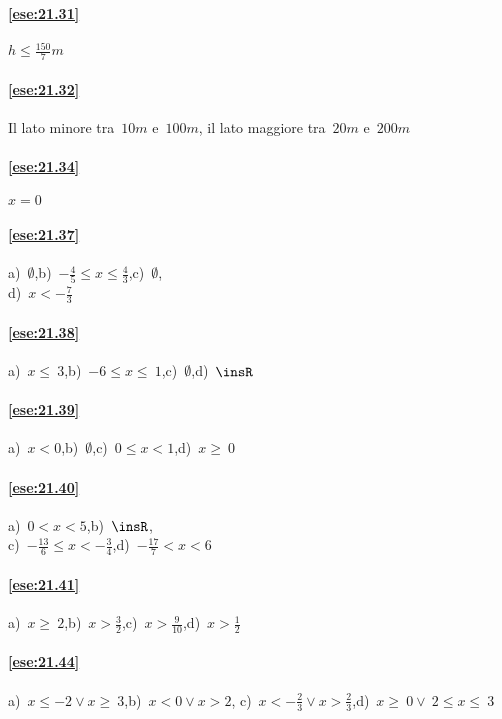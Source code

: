 \begin{multicols}{2}
\paragraph{\ref{ese:21.31}} \(h\le \frac{150}{7}m\)

\paragraph{\ref{ese:21.32}} Il lato minore tra~\(10\unit{m}\) e~\(100\unit{m}\), il lato maggiore tra~\(20\unit{m}\) e~\(200\unit{m}\)

\paragraph{\ref{ese:21.34}} \(x = 0\)

\paragraph{\ref{ese:21.37}} a)~\(\emptyset \),\quad b)~\(-{\frac{4}{5}}\le x\le\frac{4}{3}\),\quad c)~\(\emptyset \),\quad
\protect\\ d)~\(x<-{\frac{7}{3}}\)

\paragraph{\ref{ese:21.38}} a)~\(x\le~3\),\quad b)~\(-6\le x\le~1\),\quad c)~\(\emptyset \),\quad d)~\(\insR\)

\paragraph{\ref{ese:21.39}} a)~\(x<0\),\quad b)~\(\emptyset \),\quad c)~\(0\le x<1\),\quad d)~\(x\ge~0\)

\paragraph{\ref{ese:21.40}} a)~\(0<x<5\),\quad b)~\(\insR\),\quad
\protect\\ c)~\(-{\frac{13}{6}}\le x<-{\frac{3}{4}}\),\quad d)~\(-{\frac{17}{7}}<x<6\)

\paragraph{\ref{ese:21.41}} a)~\(x\ge~2\),\quad b)~\(x>\frac{3}{2}\),\quad c)~\(x>\frac{9}{10}\),\quad d)~\(x>\frac{1}{2}\)

\paragraph{\ref{ese:21.44}} a)~\(x\le -2\vee x\ge~3\),\quad b)~\(x<0\vee x>2\),\quad
c)~\(x<-{\frac{2}{3}}\vee x>\frac{2}{3}\),\quad d)~\(x\ge~0\vee~2\le x\le~3\)


\end{multicols}
